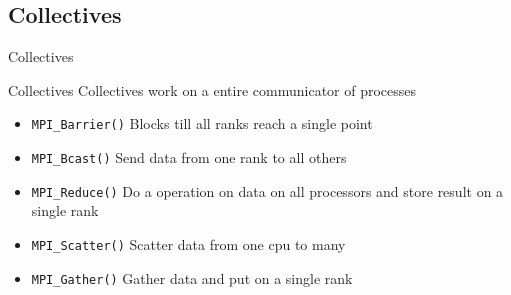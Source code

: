 \documentclass{beamer}
\begin{document}
\subsection{Collectives}
\begin{frame}{Collectives}
\begin{block}{Collectives}
 Collectives work on a entire communicator of processes
 \begin{itemize}
  \item <2->\texttt{MPI\_Barrier()} Blocks till all ranks reach a single point
  \item <2->\texttt{MPI\_Bcast()} Send data from one rank to all others
  \item <3->\texttt{MPI\_Reduce()} Do a operation on data on all processors and store result on a single rank
  \item <4->\texttt{MPI\_Scatter()} Scatter data from one cpu to many
  \item <5->\texttt{MPI\_Gather()} Gather data and put on a single rank
 \end{itemize}
\end{block}
\end{frame}
\end{document}
